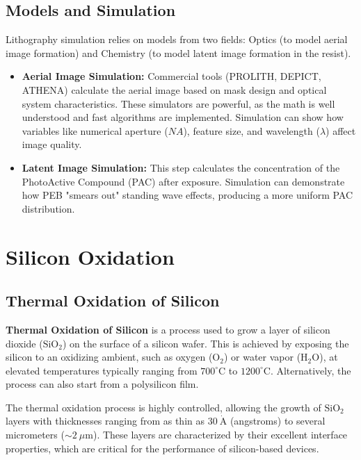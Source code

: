 \documentclass{report}
\begin{document}
\section{Models and Simulation}
Lithography simulation relies on models from two fields: Optics (to model aerial image formation) and Chemistry (to model latent image formation in the resist).
\begin{itemize} 
    \item \textbf{Aerial Image Simulation:} Commercial tools (PROLITH, DEPICT, ATHENA) calculate the aerial image based on mask design and optical system characteristics. These simulators are powerful, as the math is well understood and fast algorithms are implemented. Simulation can show how variables like numerical aperture ($NA$), feature size, and wavelength ($\lambda$) affect image quality. 
    \item \textbf{Latent Image Simulation:} This step calculates the concentration of the PhotoActive Compound (PAC) after exposure. Simulation can demonstrate how PEB "smears out" standing wave effects, producing a more uniform PAC distribution.
\end{itemize}

\clearpage

\chapter{Silicon Oxidation}

\section{Thermal Oxidation of Silicon}
\textbf{Thermal Oxidation of Silicon} is a process used to grow a layer of silicon dioxide ($\text{SiO}_{2}$) on the surface of a silicon wafer. This is achieved by exposing the silicon to an oxidizing ambient, such as oxygen ($\text{O}_{2}$) or water vapor ($\text{H}_{2}\text{O}$), at elevated temperatures typically ranging from $700^{\circ}\text{C}$ to $1200^{\circ}\text{C}$. Alternatively, the process can also start from a polysilicon film. 

The thermal oxidation process is highly controlled, allowing the growth of $\text{SiO}_{2}$ layers with thicknesses ranging from as thin as $30~\dot{\text{A}}$ (angstroms) to several micrometers ($\sim 2~\mu \text{m}$). These layers are characterized by their excellent interface properties, which are critical for the performance of silicon-based devices.
\end{document}
